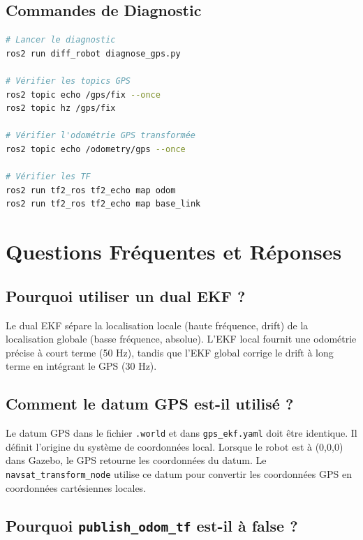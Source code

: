 \documentclass[a4paper,12pt]{article}
\begin{document}
\subsection{Commandes de Diagnostic}

\begin{lstlisting}[language=bash, caption=Commandes de Vérification]
# Lancer le diagnostic
ros2 run diff_robot diagnose_gps.py

# Vérifier les topics GPS
ros2 topic echo /gps/fix --once
ros2 topic hz /gps/fix

# Vérifier l'odométrie GPS transformée
ros2 topic echo /odometry/gps --once

# Vérifier les TF
ros2 run tf2_ros tf2_echo map odom
ros2 run tf2_ros tf2_echo map base_link
\end{lstlisting}

\section{Questions Fréquentes et Réponses}

\subsection{Pourquoi utiliser un dual EKF ?}

Le dual EKF sépare la localisation locale (haute fréquence, drift) de la localisation globale (basse fréquence, absolue). L'EKF local fournit une odométrie précise à court terme (50 Hz), tandis que l'EKF global corrige le drift à long terme en intégrant le GPS (30 Hz).

\subsection{Comment le datum GPS est-il utilisé ?}

Le datum GPS dans le fichier \texttt{.world} et dans \texttt{gps\_ekf.yaml} doit être identique. Il définit l'origine du système de coordonnées local. Lorsque le robot est à (0,0,0) dans Gazebo, le GPS retourne les coordonnées du datum. Le \texttt{navsat\_transform\_node} utilise ce datum pour convertir les coordonnées GPS en coordonnées cartésiennes locales.

\subsection{Pourquoi \texttt{publish\_odom\_tf} est-il à false ?}
\end{document}
